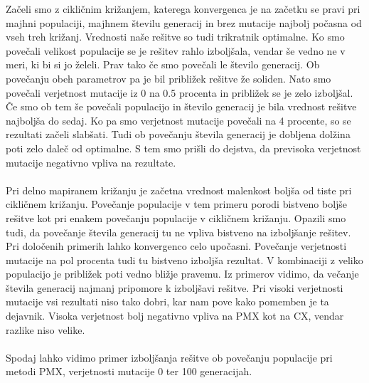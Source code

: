 \documentclass[12pt,a4paper]{amsart}
\theoremstyle{definition} %
\theoremstyle{plain} %
\begin{document}
Začeli smo z cikličnim križanjem, katerega konvergenca je na začetku se pravi pri majhni populaciji, majhnem številu generacij in brez mutacije najbolj počasna od vseh treh križanj. Vrednosti naše rešitve so tudi trikratnik optimalne. Ko smo povečali velikost populacije se je rešitev rahlo izboljšala, vendar še vedno ne v meri, ki bi si jo želeli. Prav tako če smo povečali le število generacij. Ob povečanju obeh parametrov pa je bil približek rešitve že soliden. 
Nato smo povečali verjetnost mutacije iz 0 na 0.5 procenta in približek se je zelo izboljšal. Če smo ob tem še povečali populacijo in število generacij je bila vrednost rešitve najboljša do sedaj. 
Ko pa smo verjetnost mutacije povečali na 4 procente, so se rezultati začeli slabšati. Tudi ob povečanju števila generacij je dobljena dolžina poti zelo daleč od optimalne. 
S tem smo prišli do dejstva, da previsoka verjetnost mutacije negativno vpliva na rezultate. 
\\
\\
Pri delno mapiranem križanju je začetna vrednost malenkost boljša od tiste pri cikličnem križanju. Povečanje populacije v tem primeru porodi bistveno boljše rešitve kot pri enakem povečanju populacije v cikličnem križanju. 
Opazili smo tudi, da povečanje števila generacij tu ne vpliva bistveno na izboljšanje rešitev. Pri določenih primerih lahko konvergenco celo upočasni. 
Povečanje verjetnosti mutacije na pol procenta tudi tu bistveno izboljša rezultat. V kombinaciji z veliko populacijo je približek poti vedno bližje pravemu. 
Iz primerov vidimo, da večanje števila generacij najmanj pripomore k izboljšavi rešitve. 
Pri visoki verjetnosti mutacije vsi rezultati niso tako dobri, kar nam pove kako pomemben je ta dejavnik. Visoka verjetnost bolj negativno vpliva na PMX kot na CX, vendar razlike niso velike. 
\\
\\
Spodaj lahko vidimo primer izboljšanja rešitve ob povečanju populacije pri metodi PMX, verjetnosti mutacije 0 ter 100 generacijah.
\\
\\
\end{document}
